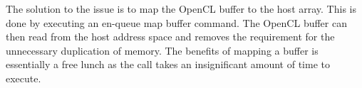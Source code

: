 The solution to the issue is to map the OpenCL buffer to the host array. This is
done by executing an en-queue map buffer command. The OpenCL buffer can then
read from the host address space and removes the requirement for the unnecessary
duplication of memory. The benefits of mapping a buffer is essentially a free
lunch as the call takes an insignificant amount of time to execute.
